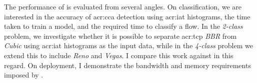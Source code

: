 
The performance of \seidr{} is evaluated from several angles.
On classification, we are interested in the accuracy of \gls{acr:cca} detection using \gls{acr:iat} histograms, the time taken to train a model, and the required time to classify a flow.
In the \emph{2-class} problem, we investigate whether it is possible to separate \gls{acr:tcp} \emph{BBR} from \emph{Cubic} using \gls{acr:iat} histograms as the input data, while in the \emph{4-class} problem we extend this to include \emph{Reno} and \emph{Vegas}.
I compare this work against \textcite{DBLP:conf/icccn/HagosEYK18} in this regard.
On deployment, I demonstrate the bandwidth and memory requirements imposed by \seidr{}.





